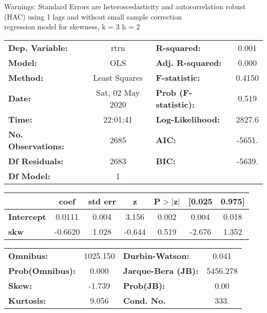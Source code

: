 Warnings: \newline
 [1] Standard Errors are heteroscedasticity and autocorrelation robust (HAC) using 1 lags and without small sample correction\\ 

regression model for skewness, k = 3 h = 2\begin{center}
\begin{tabular}{lclc}
\toprule
\textbf{Dep. Variable:}    &       rtrn       & \textbf{  R-squared:         } &     0.001   \\
\textbf{Model:}            &       OLS        & \textbf{  Adj. R-squared:    } &     0.000   \\
\textbf{Method:}           &  Least Squares   & \textbf{  F-statistic:       } &    0.4150   \\
\textbf{Date:}             & Sat, 02 May 2020 & \textbf{  Prob (F-statistic):} &    0.519    \\
\textbf{Time:}             &     22:01:41     & \textbf{  Log-Likelihood:    } &    2827.6   \\
\textbf{No. Observations:} &        2685      & \textbf{  AIC:               } &    -5651.   \\
\textbf{Df Residuals:}     &        2683      & \textbf{  BIC:               } &    -5639.   \\
\textbf{Df Model:}         &           1      & \textbf{                     } &             \\
\bottomrule
\end{tabular}
\begin{tabular}{lcccccc}
                   & \textbf{coef} & \textbf{std err} & \textbf{z} & \textbf{P$> |$z$|$} & \textbf{[0.025} & \textbf{0.975]}  \\
\midrule
\textbf{Intercept} &       0.0111  &        0.004     &     3.156  &         0.002        &        0.004    &        0.018     \\
\textbf{skw}       &      -0.6620  &        1.028     &    -0.644  &         0.519        &       -2.676    &        1.352     \\
\bottomrule
\end{tabular}
\begin{tabular}{lclc}
\textbf{Omnibus:}       & 1025.150 & \textbf{  Durbin-Watson:     } &    0.041  \\
\textbf{Prob(Omnibus):} &   0.000  & \textbf{  Jarque-Bera (JB):  } & 5456.278  \\
\textbf{Skew:}          &  -1.739  & \textbf{  Prob(JB):          } &     0.00  \\
\textbf{Kurtosis:}      &   9.056  & \textbf{  Cond. No.          } &     333.  \\
\bottomrule
\end{tabular}
\end{center}

